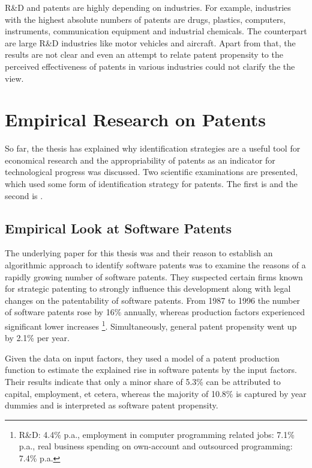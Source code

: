 \documentclass[12pt, a4paper]{scrartcl}
\theoremstyle{definition}
\begin{document}
R\&D and patents are highly depending on industries. For example, industries
with the highest absolute numbers of patents are drugs, plastics, computers,
instruments, communication equipment and industrial chemicals. The counterpart
are large R\&D industries like motor vehicles and aircraft. Apart from that,
the results are not clear and even an attempt to relate patent propensity to
the perceived effectiveness of patents in various industries could not clarify
the the view.



\section{Empirical Research on Patents} %
\label{sec:empirical_research_on_patents}

So far, the thesis has explained why identification strategies are a useful
tool for economical research and the appropriability of patents as an indicator
for technological progress was discussed. Two scientific examinations are
presented, which used some form of identification strategy for patents. The
first is \citet{bessen2007empirical} and the second is \cite{graham2013smart}.

\subsection{Empirical Look at Software Patents} %
\label{sub:empirical_look_at_software_patents}

The underlying paper for this thesis was \cite{bessen2007empirical} and their
reason to establish an algorithmic approach to identify software patents was to
examine the reasons of a rapidly growing number of software patents. They
suspected certain firms known for strategic patenting to strongly influence
this development along with legal changes on the patentability of software
patents. From 1987 to 1996 the number of software patents rose by 16\%
annually, whereas production factors experienced significant lower increases
\footnote{R\&D: 4.4\% p.a., employment in computer programming related jobs:
7.1\% p.a., real business spending on own-account and outsourced programming:
7.4\% p.a.}. Simultaneously, general patent propensity went up by 2.1\% per
year.

Given the data on input factors, they used a model of a patent production
function to estimate the explained rise in software patents by the input
factors. Their results indicate that only a minor share of 5.3\% can be
attributed to capital, employment, et cetera, whereas the majority of 10.8\% is
captured by year dummies and is interpreted as software patent propensity.
\end{document}
